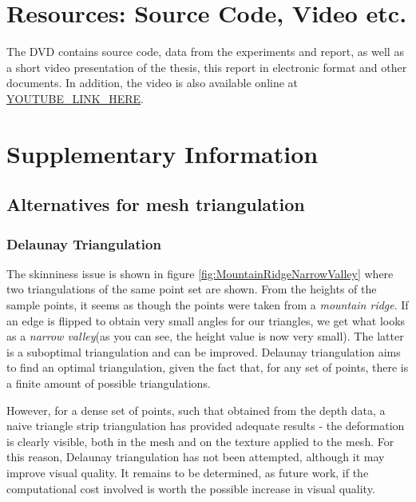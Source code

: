 \documentclass[]{article}
\begin{document}
\begin{appendices}

\section{Resources: Source Code, Video etc.}
\label{appendix:A}

The DVD contains source code, data from the experiments and report, as well as a short video presentation of the thesis, this report in electronic format and other documents. In addition, the video is also available online at \url{YOUTUBE_LINK_HERE}.


\clearpage{\pagestyle{empty}\cleardoublepage}


\section{Supplementary Information}
\label{appendix:B}
\subsection{Alternatives for mesh triangulation}

\subsubsection{Delaunay Triangulation}
\label{appendix:B-delaunay}
The skinniness issue is shown in figure \ref{fig:MountainRidgeNarrowValley} where two triangulations of the same point set are shown. From the heights of the sample points, it seems as though the points were taken from a \textit{mountain ridge}. If an edge is flipped to obtain very small angles for our triangles, we get what looks as a \textit{narrow valley}(as you can see, the height value is now very small). The latter is a suboptimal triangulation and can be improved. Delaunay triangulation aims to find an optimal triangulation, given the fact that, for any set of points, there is a finite amount of possible triangulations.

However, for a dense set of points, such that obtained from the depth data, a naive triangle strip triangulation has provided adequate results - the deformation is clearly visible, both in the mesh and on the texture applied to the mesh. For this reason, Delaunay triangulation has not been attempted, although it may improve visual quality. It remains to be determined, as future work, if the computational cost involved is worth the possible increase in visual quality.


\end{appendices}
\end{document}
